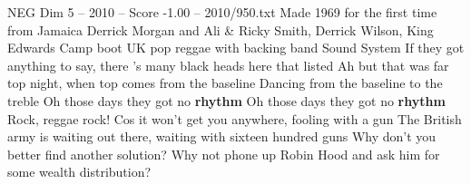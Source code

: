 \begin{textsample}{NEG Dim 5 – 2010 – Score -1.00 – 2010/950.txt}  \label{ex:f5_neg_003}
Made 1969 for the first time from Jamaica Derrick Morgan and Ali \& Ricky Smith, Derrick Wilson, King Edwards Camp boot UK pop reggae with backing band Sound System If they got anything to say, there 's many black heads here that listed Ah but that was far top night, when top comes from the baseline Dancing from the baseline to the treble Oh those days they got no \textbf{rhythm} Oh those days they got no \textbf{rhythm} Rock, reggae rock!
Cos it won't get you anywhere, fooling with a gun The British army is waiting out there, waiting with sixteen hundred guns Why don't you better find another solution?
Why not phone up Robin Hood and ask him for some wealth distribution?

\end{textsample}
